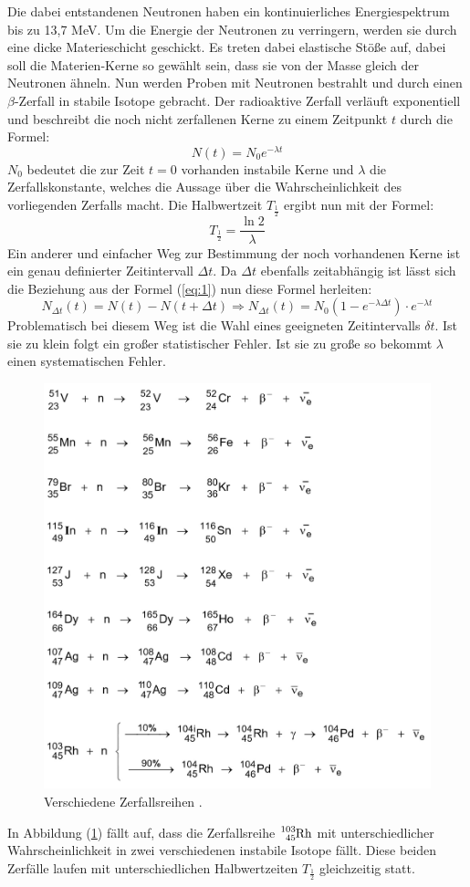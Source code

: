 Die dabei entstandenen Neutronen haben ein kontinuierliches Energiespektrum bis zu 13,7 MeV. Um die Energie der Neutronen zu verringern, werden sie durch eine
dicke Materieschicht geschickt. Es treten dabei elastische Stöße auf, dabei soll die
Materien-Kerne so gewählt sein, dass sie von der Masse gleich der Neutronen ähneln.
Nun werden Proben mit Neutronen bestrahlt und durch einen $\beta$-Zerfall in stabile Isotope gebracht.
Der radioaktive Zerfall verläuft exponentiell und beschreibt die noch nicht zerfallenen Kerne zu einem Zeitpunkt $t$ durch die Formel:
\begin{equation}
  N(t)= N_0 e^{-\lambda t}
  \label{eq:1}
\end{equation}
$N_0$ bedeutet die zur Zeit $t = 0$ vorhanden instabile Kerne und $\lambda$ die Zerfallskonstante, welches die Aussage über die Wahrscheinlichkeit
des vorliegenden Zerfalls macht.
Die Halbwertzeit $T_{\frac{1}{2}}$ ergibt nun mit der Formel:
\begin{equation}
  T_{\frac{1}{2}} = \frac{\ln 2}{\lambda}
  \label{eq:2}
\end{equation}
Ein anderer und einfacher Weg zur Bestimmung der noch vorhandenen Kerne ist
ein genau definierter Zeitintervall $\Delta t$.
Da $\Delta t$ ebenfalls zeitabhängig ist lässt sich die Beziehung aus der Formel (\ref{eq:1})
nun diese Formel herleiten:
\begin{equation}
  N_{\Delta t} (t) = N(t) - N(t+\Delta t) \Rightarrow N_{\Delta t} (t) =N_0 (1-e^{-\lambda \Delta t}) \cdot e^{-\lambda t}
  \label{eq:3}
\end{equation}
Problematisch bei diesem Weg ist die Wahl eines geeigneten Zeitintervalls $\delta t$. Ist sie zu klein folgt ein großer statistischer Fehler.
Ist sie zu große so bekommt $\lambda$ einen systematischen Fehler.
\begin{figure}
  \includegraphics[width=\textwidth]{content/Verlauf.jpg}
  \caption{Verschiedene Zerfallsreihen \cite{1}.}
  \label{abb:1}
\end{figure}
In Abbildung (\ref{abb:1}) fällt auf, dass die Zerfallsreihe $\ce{^{103}_{45}Rh}$ mit unterschiedlicher Wahrscheinlichkeit
in zwei verschiedenen instabile Isotope fällt.
Diese beiden Zerfälle laufen mit unterschiedlichen Halbwertzeiten $T_{\frac{1}{2}}$ gleichzeitig statt.
